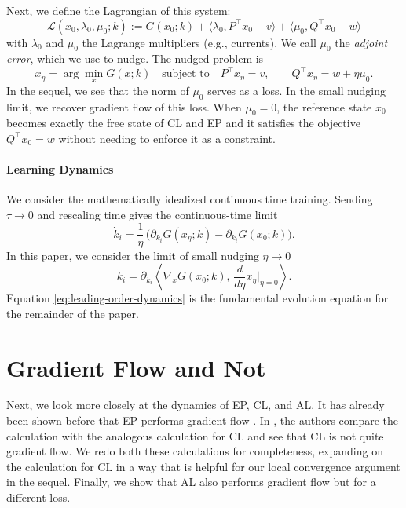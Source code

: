 \documentclass{siamart}
\begin{document}
Next, we define the Lagrangian of this system:
\begin{equation}
    \mathcal{L}(x_0,\lambda_0,\mu_0 ; k):= G(x_0;k)+\langle \lambda_0, P^\top x_0-v\rangle+\langle \mu_0, Q^\top x_0-w\rangle
    \label{eq:AL_mu_0}
\end{equation}
with $\lambda_0$ and $\mu_0$ the Lagrange multipliers (e.g., currents). We call $\mu_0$ the \textit{adjoint error}, which we use to nudge. The nudged problem is 
\begin{equation}
    x_\eta
    = \arg\min_{x} G(x;k)
    \quad\text{subject to}\quad
    P^\top x_\eta = v, 
    \qquad 
    Q^\top x_\eta = w +\eta \mu_0.
    \label{eq:AL_nudge}
\end{equation}
In the sequel, we see that the norm of $\mu_0$ serves as a loss. In the small nudging limit, we recover gradient flow of this loss.  When $\mu_0 =0$, the reference state $x_0$ becomes exactly the free state of CL and EP and it satisfies the objective $Q^\top x_0= w$ without needing to enforce it as a constraint.


\paragraph{Learning Dynamics}
We consider the mathematically idealized continuous time training. Sending $\tau \to 0$ and rescaling time gives the continuous-time limit
\begin{equation}
    \dot{k}_i
    =
    \dfrac{1}{\eta}\,\big(\partial_{k_i}
        G(x_\eta;k) - \partial_{k_i}G(x_0;k)
    \big).
    \label{eq:continuous-dynamics}
\end{equation}
In this paper, we consider the limit of small nudging $\eta \to 0$
\begin{equation}
    \dot{k}_i
    =
   \partial_{k_i}
     \left\langle \nabla_x G(x_0;k),\, \dfrac{d}{d\eta}x_\eta\bigg|_{\eta=0} \right\rangle .
    \label{eq:leading-order-dynamics}
\end{equation}
Equation 
\eqref{eq:leading-order-dynamics} is the fundamental evolution equation for the remainder of the paper.

\section{Gradient Flow and Not}
\label{EP C Laws}
Next, we look more closely at the dynamics of EP, CL, and AL. It has already been shown before that EP performs gradient flow \cite{scellier2017equilibrium}. In \cite{stern2021learning}, the authors compare the calculation with the analogous calculation for CL and see that CL is not quite gradient flow. We redo both these calculations for completeness, expanding on the calculation for CL in a way that is helpful for our local convergence argument in the sequel. Finally, we show that AL also performs gradient flow but for a different loss.
\end{document}
